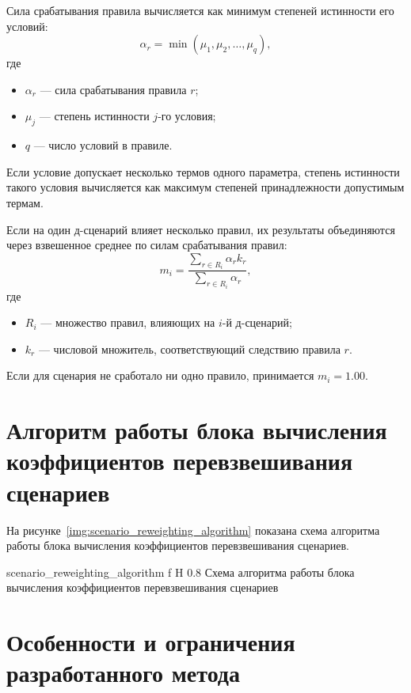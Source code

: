 Сила срабатывания правила вычисляется как минимум степеней истинности его условий:
\begin{equation}
	\label{eq:rule_activation}
	\alpha_r = \min(\mu_1, \mu_2, \dots, \mu_q),
\end{equation}
где

\begin{itemize}
	\item \(\alpha_r\) --- сила срабатывания правила \(r\);
	\item \(\mu_j\) --- степень истинности \(j\)-го условия;
	\item \(q\) --- число условий в правиле.
\end{itemize}

Если условие допускает несколько термов одного параметра, степень истинности такого условия вычисляется как максимум степеней принадлежности допустимым термам.

Если на один д-сценарий влияет несколько правил, их результаты объединяются через взвешенное среднее по силам срабатывания правил:
\begin{equation}
	\label{eq:multiplier_aggregation}
	m_i =
	\frac{\sum\limits_{r \in R_i}\alpha_r k_r}
	{\sum\limits_{r \in R_i}\alpha_r},
\end{equation}
где

\begin{itemize}
	\item \(R_i\) --- множество правил, влияющих на \(i\)-й д-сценарий;
	\item \(k_r\) --- числовой множитель, соответствующий следствию правила \(r\).
\end{itemize}

Если для сценария не сработало ни одно правило, принимается \(m_i = 1.00\).

\clearpage

\section{Алгоритм работы блока вычисления коэффициентов перевзвешивания сценариев}


На рисунке~\ref{img:scenario_reweighting_algorithm} показана схема алгоритма работы блока вычисления коэффициентов перевзвешивания сценариев.

{scenario_reweighting_algorithm}
{f}
{H}
{0.8\textwidth}
{Схема алгоритма работы блока вычисления коэффициентов перевзвешивания сценариев}

\section{Особенности и ограничения разработанного метода}

